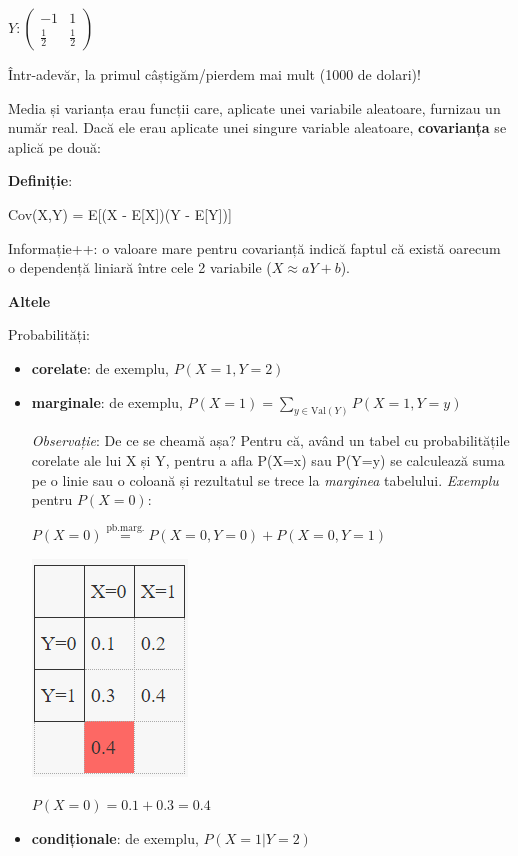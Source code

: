 \documentclass[12pt]{article}
\begin{document}
	$Y: \begin{pmatrix}
	-1 & 1\\
	\frac{1}{2} & \frac{1}{2}
	\end{pmatrix}$
	
	Într-adevăr, la primul câștigăm/pierdem mai mult (1000 de dolari)!
	
	

	Media și varianța erau funcții care, aplicate unei variabile aleatoare, furnizau un număr real. Dacă ele erau aplicate unei singure variable aleatoare, \textbf{covarianța} se aplică pe două:
	
	\textbf{Definiție}:
	
	Cov(X,Y) = E[(X - E[X])(Y - E[Y])]
	
	Informație++: o valoare mare pentru covarianță indică faptul că există oarecum o dependență liniară între cele 2 variabile ($X \approx aY + b$).
	
	\textbf{\large{Altele}}
	
	Probabilități:
	\begin{itemize}
		\item \textbf{corelate}: de exemplu, $P(X=1, Y=2)$
		\item \textbf{marginale}: de exemplu, $P(X=1)=\sum_{y\in \text{Val}(Y)}P(X=1,Y=y)$
		
		\textit{Observație}: De ce se cheamă așa? Pentru că, având un tabel cu probabilitățile corelate ale lui X și Y, pentru a afla P(X=x) sau P(Y=y) se calculează suma pe o linie sau o coloană și rezultatul se trece la \textit{marginea} tabelului. \textit{Exemplu} pentru $P(X=0)$:
		
		$P(X = 0) \stackrel{\text{pb.marg.}}{=} P(X = 0,Y = 0) + P(X = 0, Y = 1)$
		
		\begin{center}
			\includegraphics{screenshot006}
		\end{center}
		
		$P(X = 0) = 0.1 + 0.3 = 0.4$
		
		\item \textbf{condiționale}: de exemplu, $P(X=1|Y=2)$
	\end{itemize}
\end{document}
